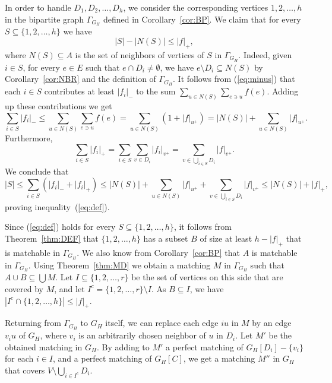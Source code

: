 \documentclass{article}
\theoremstyle{definition}
\begin{document}
In order to handle $D_1, D_2, \ldots , D_h$, we consider the corresponding vertices $1, 2, \ldots , h$ in the bipartite graph $\Gamma_{G_H}$ defined in Corollary~\ref{cor:BP}. We claim that for every $S \subseteq \{1,2, \ldots , h\}$ we have
\begin{equation} \label{eq:def}
|S| - |N(S)| \le |f|_+,
\end{equation}
where $N(S) \subseteq A$ is the set of neighbors of vertices of $S$ in $\Gamma_{G_H}$. Indeed, given $i \in S$, for every $e \in E$ such that $e \cap D_i \ne \emptyset$, we have $e \setminus D_i \subseteq N(S)$ by Corollary~\ref{cor:NBR} and the definition of $\Gamma_{G_H}$. It follows from (\ref{eq:minus}) that each $i \in S$ contributes at least $|f_i|_-$ to the sum $\sum_{u \in N(S)} \sum_{e \ni u} f(e)$. Adding up these contributions we get \[ \sum_{i \in S} |f_i|_- \le \sum_{u \in N(S)} \sum_{e \ni u} f(e) = \sum_{u \in N(S)} (1 + |f|_{u^+}) = |N(S)| + \sum_{u \in N(S)} |f|_{u^+}.\] Furthermore, \[ \sum_{i \in S} |f_i|_+ = \sum_{i \in S} \sum_{v \in D_i} |f_i|_{v^+} = \sum_{v \in \bigcup _{i \in S} D_i} |f|_{v^+}.\] We conclude that \[ |S| \le \sum_{i \in S} (|f_i|_- + |f_i|_+) \le |N(S)| + \sum_{u \in N(S)} |f|_{u^+} +\sum_{v \in \bigcup_{i \in S} D_i} |f|_{v^+} \le |N(S)| + |f|_+,\] proving inequality~(\ref{eq:def}).

Since (\ref{eq:def}) holds for every $S \subseteq \{1,2, \ldots , h\}$, it follows from Theorem~\ref{thm:DEF} that $\{1,2, \ldots , h\}$ has a subset $B$ of size at least $h - |f|_+$ that is matchable in $\Gamma_{G_H}$. We also know from Corollary~\ref{cor:BP} that $A$ is matchable in $\Gamma_{G_H}$. Using Theorem~\ref{thm:MD} we obtain a matching $M$ in $\Gamma_{G_H}$ such that $A \cup B \subseteq \bigcup M$. Let $I \subseteq \{1,2, \ldots , r\}$ be the set of vertices on this side that are covered by $M$, and let $I^c = \{1,2, \ldots , r\} \setminus I$. As $B \subseteq I$, we have $|I^c \cap \{1,2, \ldots , h\}| \le |f|_+$.

Returning from $\Gamma_{G_H}$ to $G_H$ itself, we can replace each edge $iu$ in $M$ by an edge $v_iu$ of $G_H$, where $v_i$ is an arbitrarily chosen neighbor of $u$ in $D_i$. Let $M'$ be the obtained matching in $G_H$. By adding to $M'$ a perfect matching of $G_H[D_i] - \{v_i\}$ for each $i \in I$, and a perfect matching of $G_H[C]$, we get a matching $M''$ in $G_H$ that covers $V \setminus \bigcup_{i \in I^c} D_i$.
\end{document}
